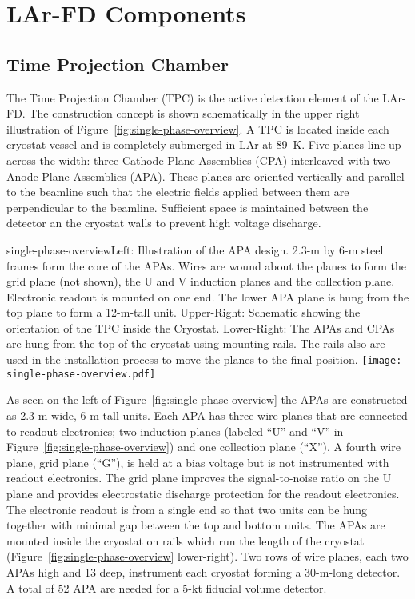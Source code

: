 \section{LAr-FD Components}
\label{sec:larfd-components}

\subsection{Time Projection Chamber}

The Time Projection Chamber (TPC) is the active detection element of the LAr-FD. The construction concept is  shown schematically in the upper right illustration of Figure~\ref{fig:single-phase-overview}.  A TPC is located inside each cryostat vessel and is completely submerged in LAr at 89~K. Five planes line up across the width: three Cathode Plane Assemblies (CPA)   interleaved with two Anode Plane Assemblies (APA). These planes are oriented vertically and  parallel to the beamline such that the electric fields applied between them are perpendicular to the beamline. Sufficient space is maintained between the detector an the cryostat walls to prevent high voltage discharge. 


\begin{cdrfigure}{single-phase-overview}{Left: Illustration of the APA design. 2.3-m by 6-m steel frames form the core of the APAs. Wires are wound about the planes to form the grid plane (not shown), the U and V induction planes and the collection plane. Electronic readout is mounted on one end. The lower APA plane is hung from the top plane to form a 12-m-tall unit. Upper-Right: Schematic showing the orientation of the TPC inside the Cryostat. Lower-Right: The APAs and CPAs are hung from the top of the cryostat using mounting rails. The rails also are used in the installation process to move the planes to the final position. }
 \texttt{[image: single-phase-overview.pdf]}
\end{cdrfigure}
 
As seen on the left of Figure~\ref{fig:single-phase-overview} the APAs are constructed as 2.3-m-wide, 6-m-tall units. Each APA has three wire planes that are connected to readout electronics; two induction planes (labeled ``U'' and ``V'' in Figure~\ref{fig:single-phase-overview}) and one collection plane (``X''). A fourth wire plane, grid plane (``G''), is held at a bias voltage but is not instrumented with readout electronics. The grid plane improves the signal-to-noise ratio on the U plane and provides electrostatic discharge protection for the readout electronics. The electronic readout is from a single end so that two units can be hung together with minimal gap between the top and bottom units. The APAs are mounted inside the cryostat on rails which run the length of the cryostat (Figure~\ref{fig:single-phase-overview} lower-right). Two rows of wire planes, each two APAs high and 13 deep, instrument each cryostat forming a 30-m-long detector. A total of 52 APA are needed for a 5-kt fiducial volume detector. 

